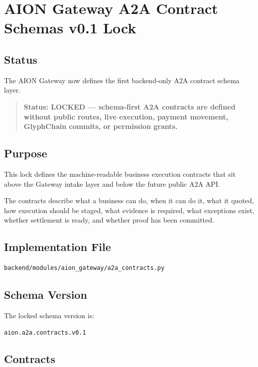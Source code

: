 \section{AION Gateway A2A Contract Schemas v0.1 Lock}
\label{sec:aion-gateway-a2a-contract-schemas-v01-lock}

\subsection{Status}

The AION Gateway now defines the first backend-only A2A contract schema layer.

\begin{quote}
\textbf{Status: LOCKED --- schema-first A2A contracts are defined without public routes, live execution, payment movement, GlyphChain commits, or permission grants.}
\end{quote}

\subsection{Purpose}

This lock defines the machine-readable business execution contracts that sit above the Gateway intake layer and below the future public A2A API.

The contracts describe what a business can do, when it can do it, what it quoted, how execution should be staged, what evidence is required, what exceptions exist, whether settlement is ready, and whether proof has been committed.

\subsection{Implementation File}

\begin{verbatim}
backend/modules/aion_gateway/a2a_contracts.py
\end{verbatim}

\subsection{Schema Version}

The locked schema version is:

\begin{verbatim}
aion.a2a.contracts.v0.1
\end{verbatim}

\subsection{Contracts}

